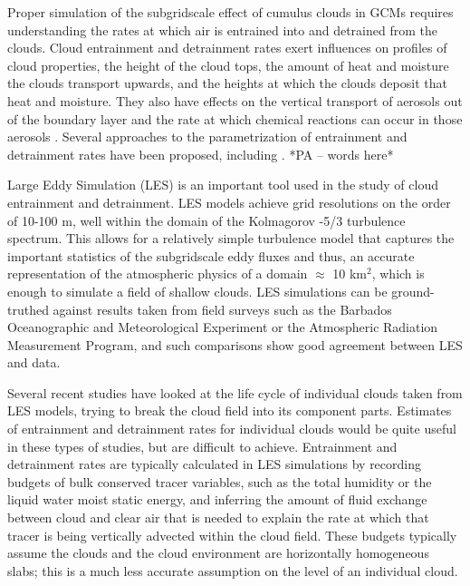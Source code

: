 \documentclass[12pt]{article}
\begin{document}
Proper simulation of the subgridscale effect of cumulus clouds in
GCMs requires understanding the rates at which air is entrained into
and detrained from the clouds. Cloud entrainment and detrainment rates
exert influences on profiles of cloud properties, the height of the
cloud tops, the amount of heat and moisture the clouds transport upwards,
and the heights at which the clouds deposit that heat and moisture.
They also have effects on the vertical transport of aerosols out of
the boundary layer and the rate at which chemical reactions can occur
in those aerosols \citep{Barahona2007,Anldrejczuk2008}. 
Several approaches to the parametrization of entrainment
and detrainment rates have been proposed, including 
\citep{Lock2000,Bretherton2009,Siebesma2007}.  *PA -- words here*


Large Eddy Simulation (LES) is an important tool used in the study
of cloud entrainment and detrainment. LES models achieve grid resolutions
on the order of 10-100 m, well within the domain of the Kolmagorov -5/3
turbulence spectrum. This allows for a relatively simple turbulence
model that captures the important statistics of the subgridscale eddy
fluxes and thus, an accurate representation of the atmospheric physics
of a domain $\approx$ 10 km$^{2}$, which is enough to simulate a field of shallow clouds. 
LES simulations can be ground-truthed against results taken from field surveys 
such as the Barbados Oceanographic and Meteorological
Experiment \citep[BOMEX;][]{Holland1973} or the Atmospheric Radiation 
Measurement \citep[ARM;][]{Brown2002} Program, and such comparisons 
show good agreement between LES and data.

Several recent studies have looked at the life cycle of individual
clouds taken from LES models, trying to break the cloud field into
its component parts. Estimates of entrainment and detrainment rates
for individual clouds would be quite useful in these types of studies,
but are difficult to achieve. Entrainment and detrainment rates are 
typically calculated in LES simulations by recording budgets
of bulk conserved tracer variables, such as the total humidity or
the liquid water moist static energy, and inferring the amount of
fluid exchange between cloud and clear air that is needed to explain
the rate at which that tracer is being vertically advected within
the cloud field. These budgets typically assume the clouds and the
cloud environment are horizontally homogeneous slabs; this is a much
less accurate assumption on the level of an individual cloud.
\end{document}
